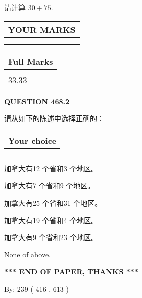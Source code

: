 \documentclass{ctexart}
\begin{document}
  
 
请计算 $ %
30 +  %
75 $.
 

 

 
  
\vspace{0.2in}
  
\noindent\begin{tabular}{|l|}
\hline
 YOUR MARKS  \\
\hline
 \\ 
 \\ 
\hline
\end{tabular}
\hspace{0.05in} \begin{tabular}{|l|}
\hline
 Full Marks  \\
\hline
 \\ 
33.33 \\
\hline
\end{tabular}
{\textbf{\Large{QUESTION
468.2 
}}}
  
  
请从如下的陈述中选择正确的：
  
  
\noindent\hspace{3.0in} \begin{tabular}{|l|}
\hline
Your choice \\
\hline
 \\ 
 \\ 
\hline
\end{tabular}
  
  
 
 
加拿大有12 个省和3 个地区。
 
 
加拿大有7 个省和9 个地区。
 
 
加拿大有25 个省和31 个地区。
 
 
加拿大有19 个省和4 个地区。
 
 
加拿大有9 个省和23 个地区。
 
 
 None of above.
 
 
   
   
 \vspace{0.2in}
 
   
   
   
   
\vspace{1.0in} 
{\textbf{\large{ *** END OF PAPER, THANKS *** }}} 
   
   
\hspace{1.0in} By: 
 239 ( 416 ,  613 )
   
\end{document}
